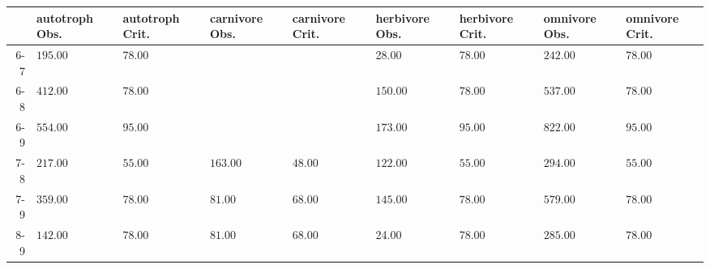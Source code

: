 \begin{table}[ht]
\centering
\begin{tabular}{rllllllll}
  \toprule
 & autotroph Obs. & autotroph Crit. & carnivore Obs. & carnivore Crit. & herbivore Obs. & herbivore Crit. & omnivore Obs. & omnivore Crit. \\ 
  \midrule
6-7 & \(\mathbf{195.00}\) & \(\mathbf{78.00}\) &  &  & 28.00 & 78.00 & \(\mathbf{242.00}\) & \(\mathbf{78.00}\) \\ 
  6-8 & \(\mathbf{412.00}\) & \(\mathbf{78.00}\) &  &  & \(\mathbf{150.00}\) & \(\mathbf{78.00}\) & \(\mathbf{537.00}\) & \(\mathbf{78.00}\) \\ 
  6-9 & \(\mathbf{554.00}\) & \(\mathbf{95.00}\) &  &  & \(\mathbf{173.00}\) & \(\mathbf{95.00}\) & \(\mathbf{822.00}\) & \(\mathbf{95.00}\) \\ 
  7-8 & \(\mathbf{217.00}\) & \(\mathbf{55.00}\) & \(\mathbf{163.00}\) & \(\mathbf{48.00}\) & \(\mathbf{122.00}\) & \(\mathbf{55.00}\) & \(\mathbf{294.00}\) & \(\mathbf{55.00}\) \\ 
  7-9 & \(\mathbf{359.00}\) & \(\mathbf{78.00}\) & \(\mathbf{81.00}\) & \(\mathbf{68.00}\) & \(\mathbf{145.00}\) & \(\mathbf{78.00}\) & \(\mathbf{579.00}\) & \(\mathbf{78.00}\) \\ 
  8-9 & \(\mathbf{142.00}\) & \(\mathbf{78.00}\) & \(\mathbf{81.00}\) & \(\mathbf{68.00}\) & 24.00 & 78.00 & \(\mathbf{285.00}\) & \(\mathbf{78.00}\) \\ 
   \bottomrule
\end{tabular}
\end{table}
